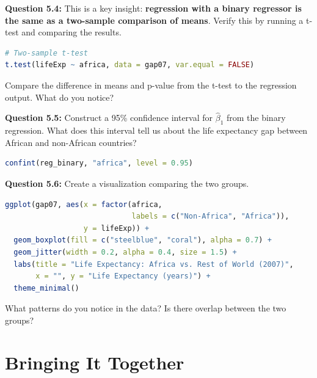 \documentclass[11pt,letterpaper]{article}
\begin{document}
\vspace{4cm}

\textbf{Question 5.4:} This is a key insight: \textbf{regression with a binary regressor is the same as a two-sample comparison of means}. Verify this by running a t-test and comparing the results.

\begin{lstlisting}[language=R]
# Two-sample t-test
t.test(lifeExp ~ africa, data = gap07, var.equal = FALSE)
\end{lstlisting}

Compare the difference in means and p-value from the t-test to the regression output. What do you notice?

\vspace{3cm}

\textbf{Question 5.5:} Construct a 95\% confidence interval for $\hat{\beta}_1$ from the binary regression. What does this interval tell us about the life expectancy gap between African and non-African countries?

\begin{lstlisting}[language=R]
confint(reg_binary, "africa", level = 0.95)
\end{lstlisting}

\vspace{3cm}

\textbf{Question 5.6:} Create a visualization comparing the two groups.

\begin{lstlisting}[language=R]
ggplot(gap07, aes(x = factor(africa,
                             labels = c("Non-Africa", "Africa")),
                  y = lifeExp)) +
  geom_boxplot(fill = c("steelblue", "coral"), alpha = 0.7) +
  geom_jitter(width = 0.2, alpha = 0.4, size = 1.5) +
  labs(title = "Life Expectancy: Africa vs. Rest of World (2007)",
       x = "", y = "Life Expectancy (years)") +
  theme_minimal()
\end{lstlisting}

What patterns do you notice in the data? Is there overlap between the two groups?

\vspace{3cm}

\newpage

\section{Bringing It Together}
\end{document}
